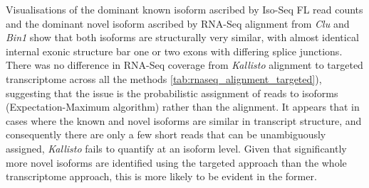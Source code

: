Visualisations of the dominant known isoform ascribed by Iso-Seq FL read counts and the dominant novel isoform ascribed by RNA-Seq alignment from \textit{Clu} and \textit{Bin1} show that both isoforms are structurally very similar, with almost identical internal exonic structure bar one or two exons with differing splice junctions. There was no difference in RNA-Seq coverage from \textit{Kallisto} alignment to targeted transcriptome across all the methods \cref{tab:rnaseq_alignment_targeted}), suggesting that the issue is the probabilistic assignment of reads to isoforms (Expectation-Maximum algorithm) rather than the alignment. It appears that in cases where the known and novel isoforms are similar in transcript structure, and consequently there are only a few short reads that can be unambiguously assigned, \textit{Kallisto} fails to quantify at an isoform level. Given that significantly more novel isoforms are identified using the targeted approach than the whole transcriptome approach, this is more likely to be evident in the former.   



